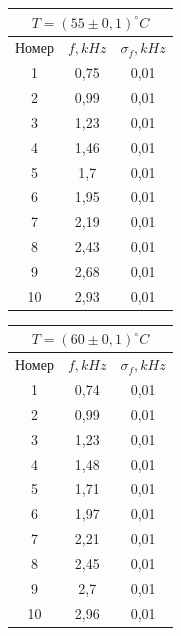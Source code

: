\documentclass[a4paper, 12pt]{article}%
\begin{document}
\begin{enumerate}
\begin{tabular}{|c|c|c|}
\hline
\multicolumn{3}{|c|}{$T = (55 \pm 0,1) ^{\circ}C$} \\ \hline
Номер & $f, kHz$ & $\sigma_f, kHz$ \\ \hline
1 & 0,75 & 0,01 \\ \hline
2 & 0,99 & 0,01 \\ \hline
3 & 1,23 & 0,01 \\ \hline
4 & 1,46 & 0,01 \\ \hline
5 & 1,7 & 0,01 \\ \hline
6 & 1,95 & 0,01 \\ \hline
7 & 2,19 & 0,01 \\ \hline
8 & 2,43 & 0,01 \\ \hline
9 & 2,68 & 0,01 \\ \hline
10 & 2,93 & 0,01 \\ \hline
\end{tabular}
\begin{tabular}{|c|c|c|}
\hline
\multicolumn{3}{|c|}{$T = (60 \pm 0,1) ^{\circ}C$} \\ \hline
Номер & $f, kHz$ & $\sigma_f, kHz$ \\ \hline
1 & 0,74 & 0,01 \\ \hline
2 & 0,99 & 0,01 \\ \hline
3 & 1,23 & 0,01 \\ \hline
4 & 1,48 & 0,01 \\ \hline
5 & 1,71 & 0,01 \\ \hline
6 & 1,97 & 0,01 \\ \hline
7 & 2,21 & 0,01 \\ \hline
8 & 2,45 & 0,01 \\ \hline
9 & 2,7 & 0,01 \\ \hline
10 & 2,96 & 0,01 \\ \hline
\end{tabular}


\end{enumerate}
\end{document}
